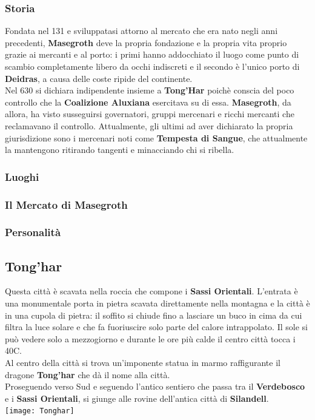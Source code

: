 \documentclass[10pt,twoside,onecolumn,openany]{book}
\begin{document}
\subsubsection{Storia}
Fondata nel 131 e sviluppatasi attorno al mercato che era nato negli anni precedenti, \textbf{Masegroth} deve la propria fondazione e la propria vita proprio grazie ai mercanti e al porto: i primi hanno addocchiato il luogo come punto di scambio completamente libero da occhi indiscreti e il secondo è l'unico porto di \textbf{Deidras}, a causa delle coste ripide del continente.\\
Nel 630 si dichiara indipendente insieme a \textbf{Tong'Har} poichè conscia del poco controllo che la \textbf{Coalizione Aluxiana} esercitava su di essa. \textbf{Masegroth}, da allora, ha visto susseguirsi governatori, gruppi mercenari e ricchi mercanti che reclamavano il controllo. Attualmente, gli ultimi ad aver dichiarato la propria giurisdizione sono i mercenari noti come \textbf{Tempesta di Sangue}, che attualmente la mantengono ritirando tangenti e minacciando chi si ribella.
\subsubsection{Luoghi}
\subsubsection{Il Mercato di Masegroth}
\subsubsection{Personalità}
\newpage
\subsection{Tong'har}
Questa città è scavata nella roccia che compone i \textbf{Sassi Orientali}. L'entrata è una monumentale porta in pietra scavata direttamente nella montagna e la città è in una cupola di pietra: il soffito si chiude fino a lasciare un buco in cima da cui filtra la luce solare e che fa fuoriuscire solo parte del calore intrappolato. Il sole si può vedere solo a mezzogiorno e durante le ore più calde il centro città tocca i 40C.\\
Al centro della città si trova un'imponente statua in marmo raffigurante il dragone \textbf{Tong'har} che dà il nome alla città.\\
Proseguendo verso Sud e seguendo l'antico sentiero che passa tra il \textbf{Verdebosco} e i \textbf{Sassi Orientali}, si giunge alle rovine dell'antica città di \textbf{Silandell}.\\
\texttt{[image: Tonghar]}
\end{document}
